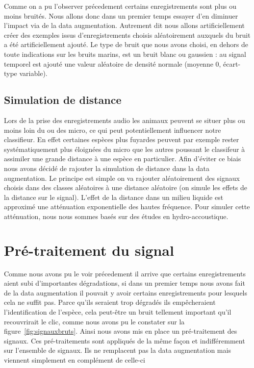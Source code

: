 Comme on a pu l'observer précedement certains enregistrements sont plus ou moins bruités.
Nous allons donc dans un premier temps essayer d'en diminuer l'impact via de la data augmentation. Autrement dit nous allons artificiellement créer des exemples issus d'enregistrements choisis aléatoirement auxquels du bruit a été artificiellement ajouté.
Le type de bruit que nous avons choisi, en dehors de toute indications sur les bruits marins, est un bruit blanc ou gaussien : au signal temporel est ajouté une valeur aléatoire de densité normale (moyenne 0, écart-type variable).

\hypertarget{Simulation-de-distance}{%
\subsection{Simulation de distance}
\label{Simulation-de-distance}}

Lors de la prise des enregistrements audio les animaux peuvent se situer plus ou moins loin du ou des micro, ce qui peut potentiellement influencer notre classifieur.
En effet certaines espèces plus fuyardes peuvent par exemple rester systématiquement plus
éloignées du micro que les autres poussant le classifeur à assimiler
une grande distance à une espèce en particulier.
Afin d'éviter ce biais nous avons décidé de rajouter la simulation de distance dans la data augmentation.
Le principe est simple on va rajouter aléatoirement des signaux choisis dans des classes aléatoires à une distance aléatoire (on simule les effets de la distance sur le signal).
L'effet de la distance dans un milieu liquide est approximé une atténuation exponentielle des hautes fréquence.
Pour simuler cette atténuation, nous nous sommes basés sur des études en hydro-accoustique.

\hypertarget{Traitement-du-signal}{%
\section{Pré-traitement du signal}
\label{Traitement-du-signal}}

Comme nous avons pu le voir précedement il arrive que certains enregistrements aient subi d'importantes dégradations, si dans un premier temps nous avons fait de la data augmentation il pouvait y avoir certains enregistrements pour lesquels cela ne suffit pas.
Parce qu'ils seraient trop dégradés ils empêcheraient l'identification de l'espèce, cela peut-être un bruit tellement important qu'il recouvrirait le clic, comme nous avons pu le constater sur la figure~\ref{fig:signauxbruts}.
Ainsi nous avons mis en place un pré-traitement des signaux.
Ces pré-traitements sont appliqués de la même façon et indifféremment sur l'ensemble de signaux.
Ils ne remplacent pas la data augmentation mais viennent simplement en complément de celle-ci

